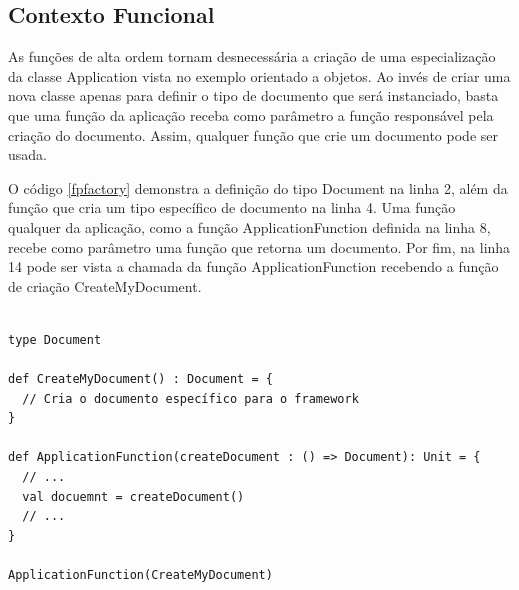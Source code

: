 \subsection*{Contexto Funcional}

As funções de alta ordem tornam desnecessária 
a criação de uma especialização da classe 
Application vista no exemplo orientado a 
objetos. Ao invés de criar uma nova classe 
apenas para definir o tipo de documento 
que será instanciado, basta que 
uma função da aplicação receba como parâmetro 
a função responsável pela criação do documento. 
Assim, qualquer função que crie um documento 
pode ser usada. 

O código \ref{fpfactory} demonstra a definição 
do tipo Document na linha 2, além da função 
que cria um tipo específico de documento na 
linha 4. Uma função qualquer da aplicação, 
como a função ApplicationFunction 
definida na linha 8, recebe como parâmetro 
uma função que retorna um documento. Por 
fim, na linha 14 pode ser vista a chamada 
da função ApplicationFunction recebendo a 
função de criação CreateMyDocument.

\begin{lstlisting}[caption={Factory Method Funcional},label=fpfactory]
    
type Document

def CreateMyDocument() : Document = {
  // Cria o documento específico para o framework
}

def ApplicationFunction(createDocument : () => Document): Unit = {
  // ...
  val docuemnt = createDocument()
  // ...
}

ApplicationFunction(CreateMyDocument)

\end{lstlisting}

